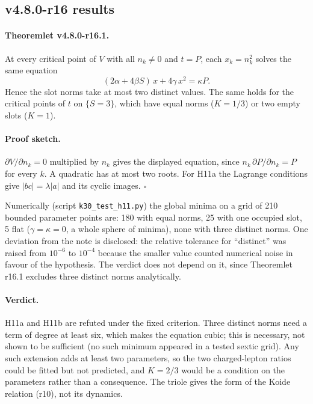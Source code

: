 \subsection*{v4.8.0-r16 results}
\label{subsec:v480-r16-results}

\paragraph{Theoremlet v4.8.0-r16.1.}
At every critical point of \(V\) with all \(n_k\neq0\) and \(t=P\), each \(x_k=n_k^2\) solves the same equation
\[
(2\alpha+4\beta S)\,x+4\gamma\,x^2=\kappa P .
\]
Hence the slot norms take at most two distinct values.  The same holds for the critical points of \(t\) on
\(\{S=3\}\), which have equal norms (\(K=1/3\)) or two empty slots (\(K=1\)).

\paragraph{Proof sketch.}
\(\partial V/\partial n_k=0\) multiplied by \(n_k\) gives the displayed equation, since \(n_k\,\partial P/\partial
n_k=P\) for every \(k\).  A quadratic has at most two roots.  For H11a the Lagrange conditions give
\(|bc|=\lambda|a|\) and its cyclic images.  \(\square\)

Numerically (script \texttt{k30\_test\_h11.py}) the global minima on a grid of 210 bounded parameter points are:
180 with equal norms, 25 with one occupied slot, 5 flat (\(\gamma=\kappa=0\), a whole sphere of minima), none with
three distinct norms.  One deviation from the note is disclosed: the relative tolerance for ``distinct'' was raised
from \(10^{-6}\) to \(10^{-4}\) because the smaller value counted numerical noise in favour of the hypothesis.  The
verdict does not depend on it, since Theoremlet r16.1 excludes three distinct norms analytically.

\paragraph{Verdict.}
H11a and H11b are refuted under the fixed criterion.  Three distinct norms need a term of degree at least six,
which makes the equation cubic; this is necessary, not shown to be sufficient (no such minimum appeared in a
tested sextic grid).  Any such extension adds at least two parameters, so the two charged-lepton ratios could be
fitted but not predicted, and \(K=2/3\) would be a condition on the parameters rather than a consequence.  The
triole gives the form of the Koide relation (r10), not its dynamics.

